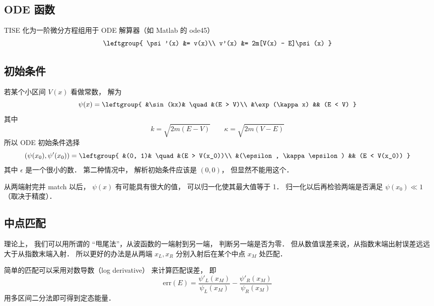 

\subsection{ODE 函数}
TISE 化为一阶微分方程组用于 ODE 解算器（如 Matlab 的 ode45）
\begin{equation}
\leftgroup{
\psi'(x) &= v(x)\\
v'(x) &= 2m[V(x) - E]\psi(x)
}\end{equation}

\subsection{初始条件}
若某个小区间 $V(x)$ 看做常数， 解为
\begin{equation}
\psi(x) = \leftgroup{
&\sin(kx)& \quad &(E > V)\\
&\exp(\kappa x) && (E < V)
}\end{equation}
其中
\begin{equation}
k = \sqrt{2m(E - V)} \qquad
\kappa = \sqrt{2m(V - E)}
\end{equation}
所以 ODE  初始条件选择
\begin{equation}
(\psi(x_0), \psi'(x_0)) = \leftgroup{
&(0, 1)& \quad &(E > V(x_0))\\
&(\epsilon, \kappa\epsilon) && (E < V(x_0))
}\end{equation}
其中 $\epsilon$ 是一个很小的数． 第二种情况中， 解析初始条件应该是 $(0, 0)$， 但显然不能用这个．

从两端射完并 match 以后， $\psi(x)$ 有可能具有很大的值， 可以归一化使其最大值等于 1． 归一化以后再检验两端是否满足 $\psi(x_0) \ll 1$（取决于精度）．

\subsection{中点匹配}
理论上， 我们可以用所谓的 “甩尾法”，从波函数的一端射到另一端， 判断另一端是否为零． 但从数值误差来说，从指数末端出射误差远远大于从指数末端入射． 所以更好的办法是从两端 $x_L, x_R$ 分别入射后在某个中点 $x_M$ 处匹配．

简单的匹配可以采用对数导数（log derivative） 来计算匹配误差， 即
\begin{equation}
\text{err}(E) = \frac{\psi'_L(x_M)}{\psi_L(x_M)} - \frac{\psi'_R(x_M)}{\psi_R(x_M)}
\end{equation}
用多区间二分法即可得到定态能量．

